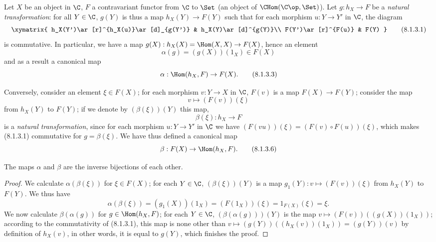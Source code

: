 \begin{env}[8.1.3]
\label{0.8.1.3}
Let $X$ be an object in $\C$, $F$ a contravariant functor from $\C$ to $\Set$
(an object of $\CHom(\C\op,\Set)$). Let $g:h_X\to F$ be a \emph{natural transformation}: for all $Y\in\C$,
$g(Y)$ is thus a map $h_X(Y)\to F(Y)$ such that for each morphism $u:Y\to Y'$ in $\C$,
the diagram
\[
  \xymatrix{
    h_X(Y')\ar[r]^{h_X(u)}\ar[d]_{g(Y')} &
    h_X(Y)\ar[d]^{g(Y)}\\
    F(Y')\ar[r]^{F(u)} &
    F(Y)
  }
  \tag{8.1.3.1}
\]
is commutative. In particular, we have a map $g(X):h_X(X)=\Hom(X,X)\to F(X)$, hence an element
\[
  \alpha(g)=(g(X))(1_X)\in F(X)
  \tag{8.1.3.2}
\]
and as a result a canonical map
\[
  \alpha:\Hom(h_X,F)\to F(X).
  \tag{8.1.3.3}
\]

Conversely, consider an element $\xi\in F(X)$; for each morphism $v:Y\to X$ in $\C$, $F(v)$ is a
map $F(X)\to F(Y)$; consider the map
\[
  v\mapsto(F(v))(\xi)
  \tag{8.1.3.4}
\]
from $h_X(Y)$ to $F(Y)$; if we denote by $(\beta(\xi))(Y)$ this map,
\[
  \beta(\xi):h_X\to F
  \tag{8.1.3.5}
\]
is a \emph{natural transformation}, since for each morphism $u:Y\to Y'$ in $\C$ we have
$(F(vu))(\xi)=(F(v)\circ F(u))(\xi)$, which makes (8.1.3.1) commutative for $g=\beta(\xi)$.
We have thus defined a canonical map
\[
  \beta:F(X)\to\Hom(h_X,F).
  \tag{8.1.3.6}
\]
\end{env}

\begin{proposition}[8.1.4]
\label{0.8.1.4}
The maps $\alpha$ and $\beta$ are the inverse bijections of each other.
\end{proposition}

\begin{proof}
\label{proof-0.8.1.4}
We calculate $\alpha(\beta(\xi))$ for $\xi\in F(X)$; for each $Y\in\C$, $(\beta(\xi))(Y)$ is a map
$g_1(Y):v\mapsto(F(v))(\xi)$ from $h_X(Y)$ to $F(Y)$. We thus have
\[
  \alpha(\beta(\xi))=(g_1(X))(1_X)=(F(1_X))(\xi)=1_{F(X)}(\xi)=\xi.
\]
We now calculate $\beta(\alpha(g))$ for $g\in\Hom(h_X,F)$; for each $Y\in\C$, $(\beta(\alpha(g)))(Y)$
is the map $v\mapsto(F(v))((g(X))(1_X))$; according to the commutativity of (8.1.3.1), this map
is none other than $v\mapsto(g(Y))((h_X(v))(1_X))=(g(Y))(v)$ by definition of $h_X(v)$, in other words,
it is equal to $g(Y)$, which finishes the proof.
\end{proof}

